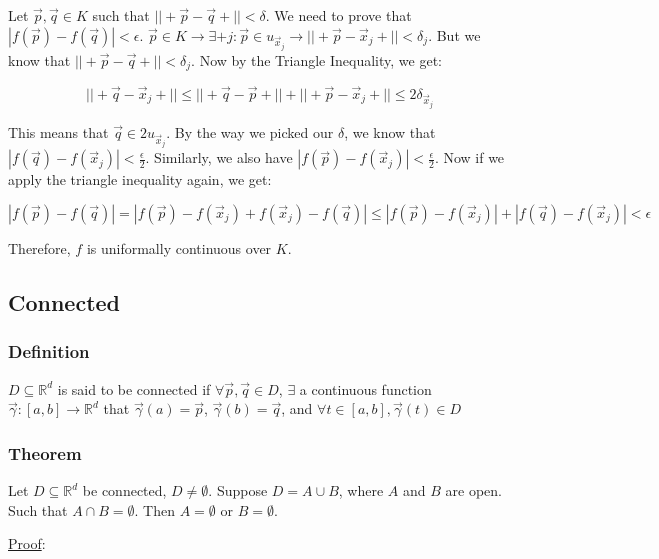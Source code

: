 \documentclass[11 pt, twoside]{article}
\begin{document}
Let $\vec{p}, \vec{q} \in K$ such that $||+\vec{p} - \vec{q}+|| < \delta$. We
need to prove that $|f(\vec{p}) - f(\vec{q})| < \epsilon$. $\vec{p} \in K \to
\exists + j : \vec{p} \in u_{\vec{x}_j} \to ||+\vec{p} - \vec{x}_j+|| <
\delta_j$. But we know that $||+\vec{p} - \vec{q}+|| < \delta_j$. Now by the
Triangle Inequality, we get:

$$||+\vec{q} - \vec{x}_j+|| \leq ||+\vec{q} - \vec{p}+|| + ||+\vec{p} - \vec{x}_j+||
\leq 2 \delta_{\vec{x}_j}$$

This means that $\vec{q} \in 2u_{\vec{x}_j}$. By the way we picked our $\delta$,
we know that $|f(\vec{q}) - f(\vec{x}_j)| < \frac{\epsilon}{2}$. Similarly,
we also have $|f(\vec{p}) - f(\vec{x}_j)| < \frac{\epsilon}{2}$. Now if we
apply the triangle inequality again, we get:

$$|f(\vec{p}) - f(\vec{q})| = |f(\vec{p}) - f(\vec{x}_j) + f(\vec{x}_j)- f(\vec{q})|\leq |f(\vec{p}) - f(\vec{x}_j)| + |f(\vec{q}) -
f(\vec{x}_j)| < \epsilon$$

Therefore, $f$ is uniformally continuous over $K$.

\subsection{Connected}

\subsubsection{Definition}
$D \subseteq \mathbb{R}^d$ is said to be connected if $\forall \vec{p},
\vec{q} \in D$, $\exists$ a continuous function $\vec{\gamma}:[a, b] \to
\mathbb{R}^d$ that $\vec{\gamma}(a) = \vec{p}$, $\vec{\gamma}(b) = \vec{q}$,
and $\forall t \in [a, b], \vec{\gamma}(t) \in D$

\subsubsection{Theorem}

Let $D \subseteq \mathbb{R}^d$ be connected, $D \neq \emptyset$. Suppose $D =
A \cup B$, where $A$ and $B$ are open. Such that $A \cap B = \emptyset$. Then $A
= \emptyset$ or $B = \emptyset$.

\underline{Proof}:
\end{document}
